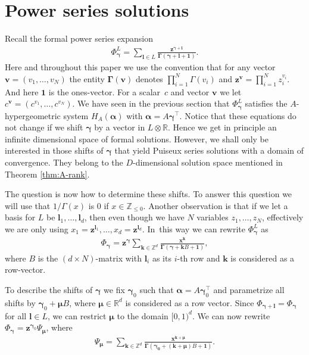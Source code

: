 \section{Power series solutions}
\label{chap-power}
Recall the formal power series expansion
\begin{gather*}\Phi_{\bm{\gamma}}^L =
\sum_{\bm{l}\in L} \frac{\bm{z}^{\bm{\gamma} + \bm{l}}}{\bm{\Gamma}(\bm{\gamma} + \bm{l} + \bm{1}) }. %
\end{gather*}
Here and throughout this paper we use the convention that for any vector $\bm{v} = \left(v_1,\dots,v_N\right)$ the entity $\bm{\Gamma}(\bm{v})$ denotes $\prod_{i=1}^N \Gamma(v_i)$ and $\bm{z}^{\bm{v}} = \prod_{i=1}^N z_i^{v_i}$. And here $\bm{1}$ is the ones-vector. For a scalar~$c$ and vector $\bm{v}$ we let $c^{\bm{v}} = \left(c^{v_1},\dots,c^{v_N}\right)$.
We have seen in the previous section that $\Phi_{\bm{\gamma}}^L$ satisfies the $A$-hypergeometric system
$H_A(\bm\alpha)$ with $\bm\alpha=A\bm\gamma^\intercal$. Notice that these equations do
not change if we shift $\bm\gamma$ by a vector in $L\otimes\mathbb{R}$. Hence we get
in principle an infinite dimensional space of formal solutions. However, we shall only
be interested in those shifts of $\bm\gamma$ that yield Puiseux series solutions with
a domain of convergence. They belong to the $D$-dimensional solution space mentioned in
Theorem \ref{thm:A-rank}.

The question is now how to determine these shifts.
To answer this question we will use that $1/\Gamma(x)$ is $0$ if $x \in \mathbb{Z}_{\leq 0}$. Another observation is that if we let a basis for $L$ be $\bm{l}_1,\dots,\bm{l}_d$, then even though we have $N$ variables $z_1,\dots,z_N$, effectively we are only using
$x_1 = \bm{z}^{\bm{l}_1},\dots,x_d = \bm{z}^{\bm{l}_d}$. In~this way we can rewrite $\Phi_{\bm{\gamma}}^L$ as
\begin{gather*}
\Phi_{\bm{\gamma}} = \bm{z}^{\bm{\gamma}}\sum_{\bm{k} \in \mathbb{Z}^d} \frac{\bm{x}^{\bm{k}}}{\bm{\Gamma}(\bm{\gamma} + \bm{k}B + \bm{1}) },
\end{gather*}
where $B$ is the $(d\times N)$-matrix with $\bm{l}_i$ as its $i$-th row and $\bm{k}$ is considered as a row-vector.

To describe the shifts of $\bm\gamma$ we fix $\bm\gamma_0$ such that $\bm\alpha
=A\bm\gamma_0^{\intercal}$ and parametrize all shifts by $\bm\gamma_0+\bm\mu B$, where $\bm\mu
\in\mathbb{R}^d$ is considered as a row vector. Since $\Phi_{\bm\gamma+\bm{l}}=\Phi_{\bm\gamma}$
for all $\bm{l}\in L$, we can restrict $\bm\mu$ to the domain $[0,1)^d$. We can
now rewrite $\Phi_{\bm\gamma}=\bm{z}^{\bm\gamma_0}\Psi_{\bm\mu}$, where
\begin{gather*}
\Psi_{\bm\mu}=\sum_{\bm{k}\in\mathbb{Z}^d}\frac{\bm{x}^{\bm{k}+\bm\mu}}
{\bm{\Gamma}(\bm{\gamma_0} + (\bm{k}+\bm\mu)B + \bm{1}) }.
\end{gather*}

